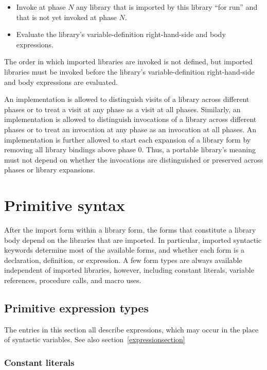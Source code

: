 \begin{itemize}
\item Invoke at phase $N$ any library that is imported by this library
      ``for {\cf run}'' and that is not yet invoked at phase $N$.
\item Evaluate the library's variable-definition right-hand-side and body
      expressions.
\end{itemize}

The order in which imported libraries are invoked is not defined, but
imported libraries must be invoked before the library's variable-definition
right-hand-side and body expressions are evaluated.

An implementation is allowed to distinguish visits of a library across
different phases or to treat a visit at any phase as a visit at all
phases.
Similarly, an implementation is allowed to distinguish invocations of a
library across different phases or to treat an invocation at any phase as
an invocation at all phases.
An implementation is further allowed to start each expansion of a
{\cf library} form by removing all library bindings above phase 0.
Thus, a portable library's meaning must not depend on whether the
invocations are distinguished or preserved across phases or {\cf library}
expansions.

\section{Primitive syntax}

After the {\cf import} form within a {\cf library} form, the forms
that constitute a library body depend on the libraries that are
imported. In particular, imported syntactic keywords determine most
of the available forms, and whether each form is a declaration,
definition, or expression. A few form types are
always available independent of imported libraries, however,
including constant literals, variable references, procedure calls,
 and macro uses.

\subsection{Primitive expression types}
\label{primitiveexpressionsection}

The entries in this section all describe expressions, which may occur
in the place of  syntactic variables.  See
also section~\ref{expressionsection}

\subsubsection*{Constant literals}\unsection

